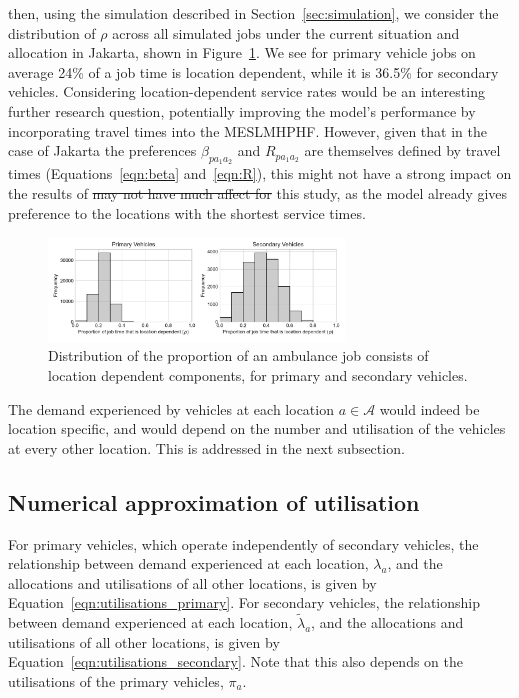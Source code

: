 \documentclass[numbers,webpdf,imaman]{ima-authoring-template}%
\begin{document}
\noindent
then, using the simulation described in Section~\ref{sec:simulation}, we
consider the distribution of $\rho$ across all simulated jobs under the current
situation and allocation in Jakarta, shown in Figure~\ref{fig:rho_distribution}.
We see for primary vehicle jobs on average 24\% of a job time is location
dependent, while it is 36.5\% for secondary vehicles. Considering
location-dependent service rates would be an interesting further research
question, potentially improving the model's performance by incorporating travel
times into the MESLMHPHF. However, given that in the case of Jakarta the
preferences $\beta_{p a_1 a_2}$ and $R_{p a_1 a_2}$ are themselves defined by
travel times (Equations~\ref{eqn:beta} and~\ref{eqn:R}), this might not have a strong impact on the results of \st{may not have much
affect for} this study, as the model already gives preference to
the locations with the shortest service times.

\begin{figure}
    \centering
    \includegraphics[width=0.7\textwidth]{img/location_dependant_service_time_proportion}
    \caption{Distribution of the proportion of an ambulance job consists of
    location dependent components, for primary and secondary vehicles.}
    \label{fig:rho_distribution}
\end{figure}

The demand experienced by vehicles at each location $a \in \mathcal{A}$ would
indeed be location specific, and would depend on the number and utilisation of
the vehicles at every other location. This is addressed in the next subsection.


\subsection{Numerical approximation of utilisation}
For primary vehicles, which operate independently of secondary vehicles, the
relationship between demand experienced at each location, $\lambda_a$, and the
allocations and utilisations of all other locations, is given by
Equation~\ref{eqn:utilisations_primary}. For secondary vehicles, the
relationship between demand experienced at each location, $\tilde{\lambda}_a$,
and the allocations and utilisations of all other locations, is given by
Equation~\ref{eqn:utilisations_secondary}. Note that this also depends on the
utilisations of the primary vehicles, $\pi_a$.
\end{document}
